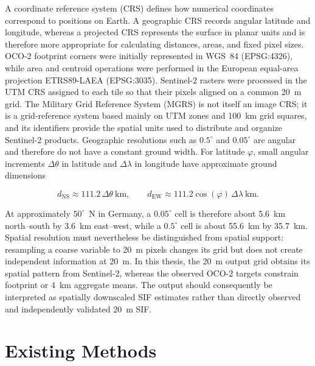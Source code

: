 A coordinate reference system (CRS) defines how numerical coordinates correspond to positions on Earth. A geographic CRS records angular latitude and longitude, whereas a projected CRS represents the surface in planar units and is therefore more appropriate for calculating distances, areas, and fixed pixel sizes. OCO-2 footprint corners were initially represented in WGS~84 (EPSG:4326), while area and centroid operations were performed in the European equal-area projection ETRS89-LAEA (EPSG:3035). Sentinel-2 rasters were processed in the UTM CRS assigned to each tile so that their pixels aligned on a common 20~m grid. The Military Grid Reference System (MGRS) is not itself an image CRS; it is a grid-reference system based mainly on UTM zones and 100~km grid squares, and its identifiers provide the spatial units used to distribute and organize Sentinel-2 products. Geographic resolutions such as \(0.5^{\circ}\) and \(0.05^{\circ}\) are angular and therefore do not have a constant ground width. For latitude \(\varphi\), small angular increments \(\Delta\theta\) in latitude and \(\Delta\lambda\) in longitude have approximate ground dimensions

\begin{equation}
d_{\mathrm{NS}}\approx111.2\,\Delta\theta\ \mathrm{km},
\qquad
d_{\mathrm{EW}}\approx111.2\cos(\varphi)\,\Delta\lambda\ \mathrm{km}.
\label{eq:degree_ground_distance}
\end{equation}

At approximately \(50^{\circ}\)~N in Germany, a \(0.05^{\circ}\) cell is therefore about 5.6~km north--south by 3.6~km east--west, while a \(0.5^{\circ}\) cell is about 55.6~km by 35.7~km. Spatial resolution must nevertheless be distinguished from spatial support: resampling a coarse variable to 20~m pixels changes its grid but does not create independent information at 20~m. In this thesis, the 20~m output grid obtains its spatial pattern from Sentinel-2, whereas the observed OCO-2 targets constrain footprint or 4~km aggregate means. The output should consequently be interpreted as spatially downscaled SIF estimates rather than directly observed and independently validated 20~m SIF.


\section{Existing Methods}

